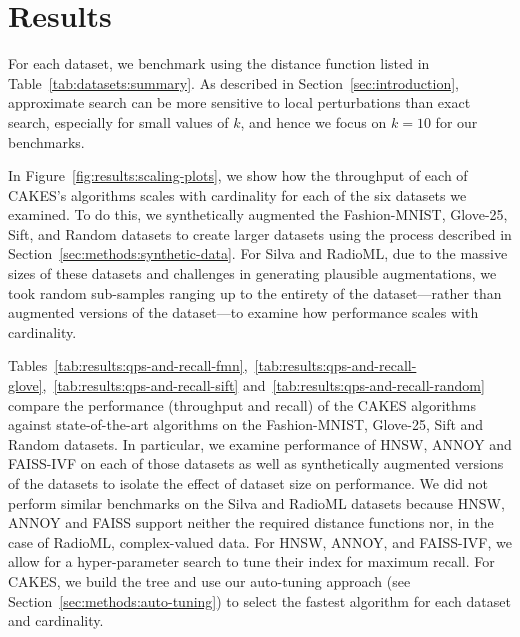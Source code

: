 \section{Results}
\label{sec:results}



For each dataset, we benchmark using the distance function listed in Table~\ref{tab:datasets:summary}. As described in Section~\ref{sec:introduction}, approximate search can be more sensitive to local perturbations than exact search, especially for small values of $k$, and hence we focus on $k=10$ for our benchmarks. 

In Figure~\ref{fig:results:scaling-plots}, we show how the throughput of each of CAKES's algorithms scales with cardinality for each of the six datasets we examined. To do this, we synthetically augmented the Fashion-MNIST, Glove-25, Sift, and Random datasets to create larger datasets using the process described in Section~\ref{sec:methods:synthetic-data}. For Silva and RadioML, due to the massive sizes of these datasets and challenges in generating plausible augmentations, we took random sub-samples ranging up to the entirety of the dataset---rather than augmented versions of the dataset---to examine how performance scales with cardinality.


Tables~\ref{tab:results:qps-and-recall-fmn},~\ref{tab:results:qps-and-recall-glove},~\ref{tab:results:qps-and-recall-sift} and~\ref{tab:results:qps-and-recall-random} compare the performance (throughput and recall) of the CAKES algorithms against state-of-the-art algorithms on the Fashion-MNIST, Glove-25, Sift and Random datasets. In particular, we examine performance of HNSW, ANNOY and FAISS-IVF on each of those datasets as well as synthetically augmented versions of the datasets to isolate the effect of dataset size on performance. We did not perform similar benchmarks on the Silva and RadioML datasets because HNSW, ANNOY and FAISS support neither the required distance functions nor, in the case of RadioML, complex-valued data. For HNSW, ANNOY, and FAISS-IVF, we allow for a hyper-parameter search to tune their index for maximum recall.
For CAKES, we build the tree and use our auto-tuning approach (see Section~\ref{sec:methods:auto-tuning}) to select the fastest algorithm for each dataset and cardinality.



